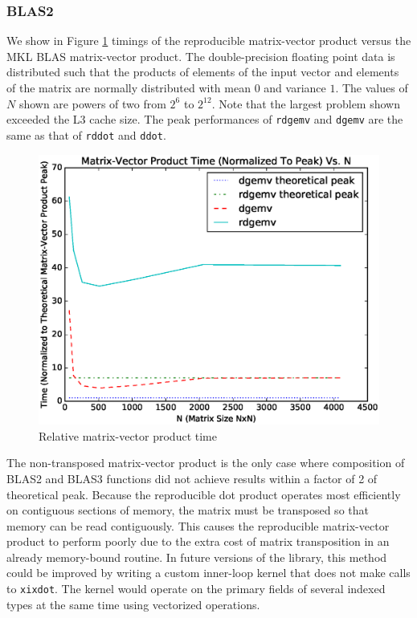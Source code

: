   \subsubsection{BLAS2}
    We show in Figure \ref{fig:gemv_timings} timings of the reproducible matrix-vector product versus the MKL BLAS matrix-vector product. The double-precision floating point data is distributed such that the products of elements of the input vector and elements of the matrix are normally distributed with mean $0$ and variance $1$. The values of $N$ shown are powers of two from $2^6$ to $2^{12}$. Note that the largest problem shown exceeded the L3 cache size. The peak performances of \texttt{rdgemv} and \texttt{dgemv} are the same as that of \texttt{rddot} and \texttt{ddot}.
  \begin{figure}[H]
  \begin{center}
  \includegraphics[width=\textwidth]{plots/gemv_comparison}
  \caption{Relative matrix-vector product time}
  \label{fig:gemv_timings}
  \end{center}
  \end{figure}
  The non-transposed matrix-vector product is the only case where composition of BLAS2 and BLAS3 functions did not achieve results within a factor of 2 of theoretical peak. Because the reproducible dot product operates most efficiently on contiguous sections of memory, the matrix must be transposed so that memory can be read contiguously. This causes the reproducible matrix-vector product to perform poorly due to the extra cost of matrix transposition in an already memory-bound routine. In future versions of the library, this method could be improved by writing a custom inner-loop kernel that does not make calls to \texttt{xixdot}. The kernel would operate on the primary fields of several indexed types at the same time using vectorized operations.

